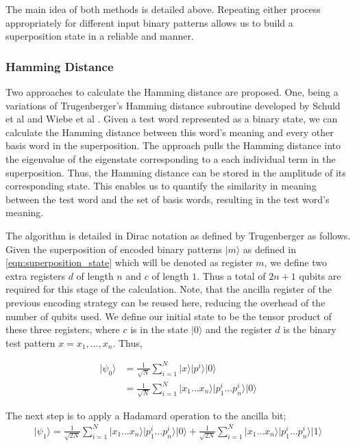 The main idea of both methods is detailed above. Repeating either process appropriately for different input binary patterns allows us to build a superposition state in a reliable and manner.

\subsubsection{Hamming Distance}
Two approaches to calculate the Hamming distance are proposed. One, being a variations of Trugenberger's Hamming distance subroutine developed by Schuld et al \cite{Trugenberger_2001, Schuld_Sinayskiy_Petruccione_2014} and Wiebe et al \cite{Wiebe_Kapoor_Svore_2014}. Given a test word represented as a binary state, we can calculate the Hamming distance between this word's meaning and every other basis word in the superposition. The approach pulls the Hamming distance into the eigenvalue of the eigenstate corresponding to a each individual term in the superposition. Thus, the Hamming distance can be stored in the amplitude of its corresponding state. This enables us to quantify the similarity in meaning between the test word and the set of basis words, resulting in the test word's meaning.

The algorithm is detailed in Dirac notation as defined by Trugenberger \cite{Trugenberger_2001} as follows. Given the superposition of encoded binary patterns $\vert m \rangle$ as defined in \ref{eqn:superposition_state} which will be denoted as register $m$, we define two extra registers $d$ of length $n$ and $c$ of length $1$. Thus a total of $2n + 1$ qubits are required for this stage of the calculation. Note, that the ancilla register of the previous encoding strategy can be reused here, reducing the overhead of the number of qubits used. We define our initial state to be the tensor product of these three registers, where $c$ is in the state $\vert 0 \rangle$ and the register $d$ is the binary test pattern $x = x_1,\dots,x_n$. Thus,

\begin{align*}
    \vert \psi_0 \rangle &= \frac{1}{\sqrt{N}}\sum\limits_{i=1}^{N} \vert x \rangle \vert p^i \rangle \vert 0 \rangle \\
    &= \frac{1}{\sqrt{N}}\sum\limits_{i=1}^{N} \vert x_1\dots x_n\rangle\vert p_{1}^{i}\dots p_{n}^{i}\rangle \vert 0 \rangle
\end{align*}

The next step is to apply a Hadamard operation to the ancilla bit;
\begin{align*}
    \vert \psi_1 \rangle = \frac{1}{\sqrt{2N}}\sum\limits_{i=1}^{N} \vert x_1\dots x_n\rangle\vert p_{1}^{i}\dots p_{n}^{i}\rangle \vert 0 \rangle + \frac{1}{\sqrt{2N}}\sum\limits_{i=1}^{N} \vert x_1\dots x_n\rangle\vert p_{1}^{i}\dots p_{n}^{i}\rangle \vert 1 \rangle
\end{align*}

